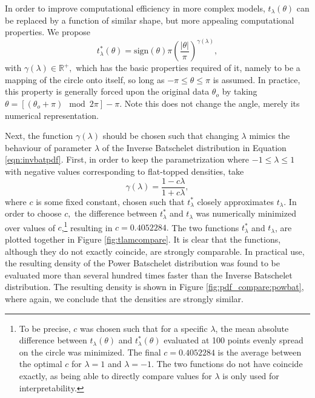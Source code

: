 In order to improve computational efficiency in more complex models, \(t_\lambda(\theta)\) can be replaced by a function of similar shape, but more appealing computational properties. We propose
\begin{equation}
  t_{\lambda}^\ast(\theta) = \text{sign}(\theta)\pi \left( \frac{\vert\theta\vert}{\pi} \right)^{\gamma(\lambda)},
\end{equation}
with \(\gamma(\lambda) \in \mathbb{R}^+,\) which has the basic properties required of it, namely to be a mapping of the circle onto itself, so long as \(-\pi \leq \theta \leq \pi \) is assumed. In practice, this property is generally forced upon the original data \(\theta_{o}\) by taking \( \theta = [(\theta_{o} + \pi) \mod 2\pi] - \pi.\) Note this does not change the angle, merely its numerical representation.

Next, the function \(\gamma(\lambda)\) should be chosen such that changing \(\lambda\) mimics the behaviour of parameter \(\lambda\) of the Inverse Batschelet distribution in Equation \ref{eqn:invbatpdf}. First, in order to keep the parametrization where \(-1 \leq \lambda \leq 1\) with negative values corresponding to flat-topped densities, take
\begin{equation}
  \gamma(\lambda) = \frac{1 - c\lambda}{1 + c\lambda},
\end{equation}
where \(c\) is some fixed constant, chosen such that \(t_\lambda^\ast\) closely approximates \(t_\lambda.\) In order to choose \(c,\) the difference between \(t_\lambda^\ast\) and \(t_\lambda\) was numerically minimized over values of \(c\),\footnote{To be precise, \(c\) was chosen such that for a specific \(\lambda\), the mean absolute difference between \(t_{\lambda}(\theta)\) and \(t_{\lambda}^\ast(\theta)\) evaluated at 100 points evenly spread on the circle was minimized. The final \(c =  0.4052284\) is the average between the optimal \(c\) for \(\lambda = 1\) and \(\lambda = -1\). The two functions do not have coincide exactly, as being able to directly compare values for \(\lambda\) is only used for interpretability. } resulting in \(c = 0.4052284.\) The two functions \(t_\lambda^\ast\) and \(t_\lambda\), are plotted together in Figure \ref{fig:tlamcompare}. It is clear that the functions, although they do not exactly coincide, are strongly comparable. In practical use, the resulting density of the Power Batschelet distribution was found to be evaluated more than several hundred times faster than the Inverse Batschelet distribution. The resulting density is shown in Figure \ref{fig:pdf_compare:powbat}, where again, we conclude that the densities are strongly similar.




